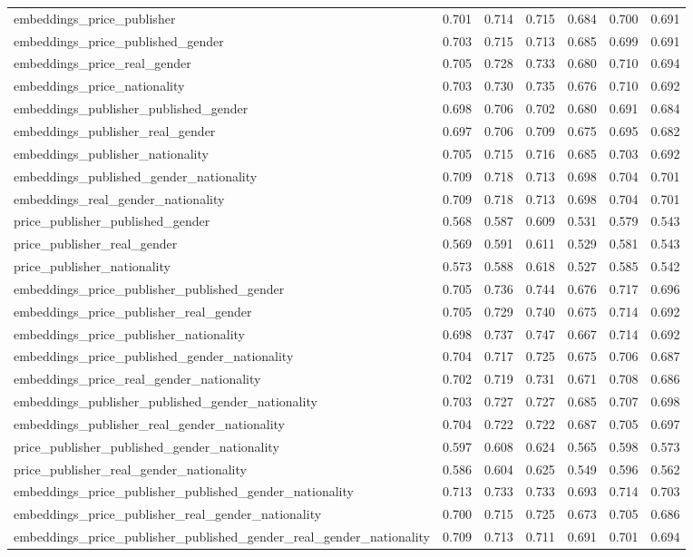 \begin{table*}
\begin{tabular}{l|cc|cc|cc}
    embeddings_price_publisher & 0.701 & 0.714 & 0.715 & 0.684 & 0.700 & 0.691 \\
    embeddings_price_published_gender & 0.703 & 0.715 & 0.713 & 0.685 & 0.699 & 0.691 \\
    embeddings_price_real_gender & 0.705 & 0.728 & 0.733 & 0.680 & 0.710 & 0.694 \\
    embeddings_price_nationality & 0.703 & 0.730 & 0.735 & 0.676 & 0.710 & 0.692 \\
    embeddings_publisher_published_gender & 0.698 & 0.706 & 0.702 & 0.680 & 0.691 & 0.684 \\
    embeddings_publisher_real_gender & 0.697 & 0.706 & 0.709 & 0.675 & 0.695 & 0.682 \\
    embeddings_publisher_nationality & 0.705 & 0.715 & 0.716 & 0.685 & 0.703 & 0.692 \\
    embeddings_published_gender_nationality & 0.709 & 0.718 & 0.713 & 0.698 & 0.704 & 0.701 \\
    embeddings_real_gender_nationality & 0.709 & 0.718 & 0.713 & 0.698 & 0.704 & 0.701 \\
    price_publisher_published_gender & 0.568 & 0.587 & 0.609 & 0.531 & 0.579 & 0.543 \\
    price_publisher_real_gender & 0.569 & 0.591 & 0.611 & 0.529 & 0.581 & 0.543 \\
    price_publisher_nationality & 0.573 & 0.588 & 0.618 & 0.527 & 0.585 & 0.542 \\
    embeddings_price_publisher_published_gender & 0.705 & 0.736 & 0.744 & 0.676 & 0.717 & 0.696 \\
    embeddings_price_publisher_real_gender & 0.705 & 0.729 & 0.740 & 0.675 & 0.714 & 0.692 \\
    embeddings_price_publisher_nationality & 0.698 & 0.737 & 0.747 & 0.667 & 0.714 & 0.692 \\
    embeddings_price_published_gender_nationality & 0.704 & 0.717 & 0.725 & 0.675 & 0.706 & 0.687 \\
    embeddings_price_real_gender_nationality & 0.702 & 0.719 & 0.731 & 0.671 & 0.708 & 0.686 \\
    embeddings_publisher_published_gender_nationality & 0.703 & 0.727 & 0.727 & 0.685 & 0.707 & 0.698 \\
    embeddings_publisher_real_gender_nationality & 0.704 & 0.722 & 0.722 & 0.687 & 0.705 & 0.697 \\
    price_publisher_published_gender_nationality & 0.597 & 0.608 & 0.624 & 0.565 & 0.598 & 0.573 \\
    price_publisher_real_gender_nationality & 0.586 & 0.604 & 0.625 & 0.549 & 0.596 & 0.562 \\
    embeddings_price_publisher_published_gender_nationality & 0.713 & 0.733 & 0.733 & 0.693 & 0.714 & 0.703 \\
    embeddings_price_publisher_real_gender_nationality & 0.700 & 0.715 & 0.725 & 0.673 & 0.705 & 0.686 \\
    embeddings_price_publisher_published_gender_real_gender_nationality & 0.709 & 0.713 & 0.711 & 0.691 & 0.701 & 0.694 \\


\end{tabular}
\end{table*}

